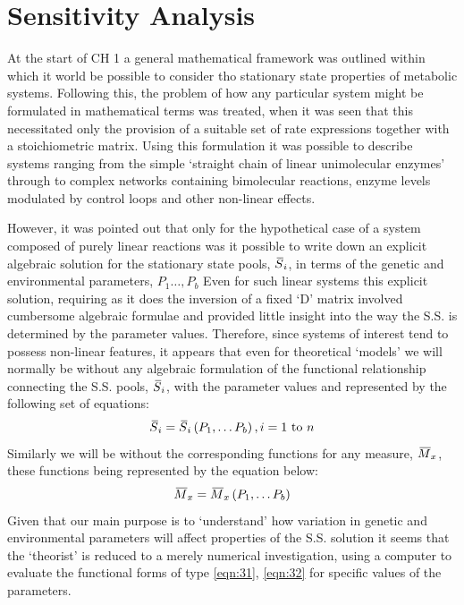 

\chapter{Sensitivity Analysis}

At the start of CH 1 a general mathematical framework was outlined within which it world be possible to consider tho stationary state properties of metabolic systems. Following this, the problem of how any particular system might be formulated in mathematical terms was treated, when it was seen that this necessitated only the provision of a suitable set of rate expressions together with a stoichiometric matrix. Using this formulation it was possible to describe systems ranging from the simple `straight chain of linear unimolecular enzymes' through to complex networks containing bimolecular reactions, enzyme levels modulated by control loops and other non-linear effects.

However, it was pointed out that only for the hypothetical case of a system composed of purely linear reactions was it possible to write down an explicit algebraic solution for the stationary state pools, $\,\overline{\!{S}}_{i}$, in terms of the genetic and environmental parameters, $P_{1} \ldots, P_{b}$ Even for such linear systems this explicit solution, requiring as it does the inversion of a fixed `D' matrix involved cumbersome algebraic formulae and provided little insight into the way the S.S. is determined by the parameter values. Therefore, since systems of interest tend to possess non-linear features, it appears that even for theoretical `models' we will normally be without any algebraic formulation of the functional relationship connecting the S.S. pools, $\,\overline{\!{S}}_{i}$, with the parameter values and represented by the following set of equations:
%
\begin{equation}
\,\overline{\!{S}}_{i}=\,\overline{\!{S}}_{i}\left(P_{1}, \ldots P_{b}\right), i=1 \text { to } n
\label{eqn:31}
\end{equation}
%
Similarly we will be without the corresponding functions for any measure, $\,\overline{\!{M}}_{x}$, these functions being represented by the equation below:
%
\begin{equation}
\,\overline{\!{M}}_{x}=\,\overline{\!{M}}_{x}\left(P_{1}, \ldots P_{b}\right)
\label{eqn:32}
\end{equation}
%
Given that our main purpose is to `understand' how variation in genetic and environmental parameters will affect properties of the S.S. solution it seems that the `theorist' is reduced to a merely numerical investigation, using a computer to evaluate the functional forms of type \eqref{eqn:31}, \eqref{eqn:32}  for specific values of the parameters.

